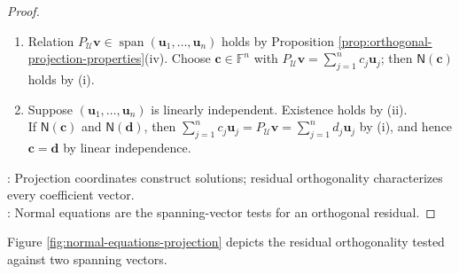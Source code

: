 \begin{theorem}
\begin{proof}
\begin{enumerate}[label=(\roman*)]
Hence $\mathbf{v}-\mathbf{q}\in\mathcal{U}^{\perp}$, and $\mathbf{q}=P_{\mathcal{U}}\mathbf{v}$ by uniqueness in Theorem \ref{thm:orthogonal-direct-sum-decomposition}.
\item[$(ii)$] Relation $P_{\mathcal{U}}\mathbf{v}\in\operatorname{span}(\mathbf{u}_1,\ldots,\mathbf{u}_n)$ holds by Proposition \ref{prop:orthogonal-projection-properties}(iv). Choose $\mathbf{c}\in\mathbb{F}^n$ with $P_{\mathcal{U}}\mathbf{v}=\sum\limits_{j=1}^{n}c_j\mathbf{u}_j$; then $\mathsf{N}(\mathbf{c})$ holds by (i).
\item[$(iii)$] Suppose $(\mathbf{u}_1,\ldots,\mathbf{u}_n)$ is linearly independent. Existence holds by (ii).\\
If $\mathsf{N}(\mathbf{c})$ and $\mathsf{N}(\mathbf{d})$, then $\sum\limits_{j=1}^{n}c_j\mathbf{u}_j=P_{\mathcal{U}}\mathbf{v}=\sum\limits_{j=1}^{n}d_j\mathbf{u}_j$ by (i), and hence $\mathbf{c}=\mathbf{d}$ by linear independence.
\end{enumerate}
: Projection coordinates construct solutions; residual orthogonality characterizes every coefficient vector.\\
: Normal equations are the spanning-vector tests for an orthogonal residual.
\end{proof}
\end{theorem}

Figure \ref{fig:normal-equations-projection} depicts the residual orthogonality tested against two spanning vectors.
\begin{illustrationfigure}[H]
  \centering
  
  \caption{Normal equations impose $(\forall\,i\in\{1,\ldots,n\})\,\innerprod{\mathbf{v}-P_{\mathcal{U}}\mathbf{v},\mathbf{u}_i}=0$.}
  \label{fig:normal-equations-projection}
\end{illustrationfigure}

